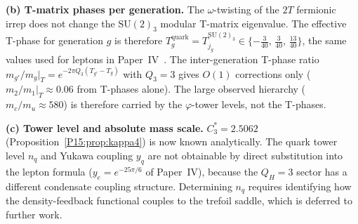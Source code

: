 \documentclass[11pt,a4paper]{article}
\theoremstyle{definition}\newtheorem{definition}[theorem]{Definition}
\theoremstyle{remark}
\newcommand{\vp}{\varphi}
\newcommand{\twoT}{2T}
\newcommand{\QH}{Q_H}
\begin{document}
\begin{enumerate}[noitemsep,label=(\roman*)]
  \textbf{(b) T-matrix phases per generation.}
  The $\omega$-twisting of the $\twoT$ fermionic irrep does not change
  the $\mathrm{SU}(2)_3$ modular T-matrix eigenvalue.
  The effective T-phase for generation $g$ is therefore
  $T_g^{\mathrm{quark}} = T_{j_g}^{\mathrm{SU}(2)_3}
  \in\{-\tfrac{3}{40},\,\tfrac{3}{40},\,\tfrac{13}{40}\}$,
  the same values used for leptons in Paper~IV~\cite{Paper4}.
  The inter-generation T-phase ratio
  $m_{g'}/m_g|_T = e^{-2\pi Q_3(T_{g'}-T_g)}$ with $Q_3=3$
  gives $O(1)$ corrections only
  ($m_2/m_1|_T \approx 0.06$ from T-phases alone).
  The large observed hierarchy ($m_c/m_u\approx580$)
  is therefore carried by the $\vp$-tower levels, not the T-phases.

  \textbf{(c) Tower level and absolute mass scale.}
  $C_3^*=2.5062$ (Proposition~\ref{P15:prop:kappa4}) is now known analytically.
  The quark tower level $n_q$ and Yukawa coupling $y_q$ are not
  obtainable by direct substitution into the lepton formula
  ($y_e=e^{-25\pi/6}$ of Paper~IV), because the $\QH=3$ sector
  has a different condensate coupling structure.
  Determining $n_q$ requires identifying how the density-feedback
  functional couples to the trefoil saddle, which is deferred to further work.
\end{enumerate}
\end{document}
